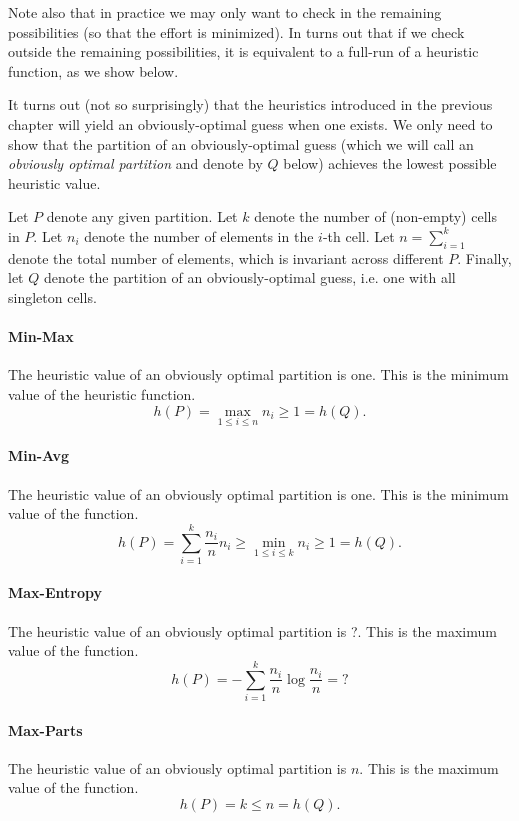 Note also that in practice we may only want to check in the remaining possibilities (so that the effort is minimized). In turns out that if we check outside the remaining possibilities, it is equivalent to a full-run of a heuristic function, as we show below.

It turns out (not so surprisingly) that the heuristics introduced in the previous chapter will yield an obviously-optimal guess when one exists. We only need to show that the partition of an obviously-optimal guess (which we will call an \emph{obviously optimal partition} and denote by $Q$ below) achieves the lowest possible heuristic value.

Let $P$ denote any given partition. Let $k$ denote the number of (non-empty) cells in $P$. Let $n_i$ denote the number of elements in the $i$-th cell. Let $n = \sum_{i=1}^k$ denote the total number of elements, which is invariant across different $P$. Finally, let $Q$ denote the partition of an obviously-optimal guess, i.e. one with all singleton cells.

\paragraph{Min-Max} 
The \minmax{} heuristic value of an obviously optimal partition is one. This is the minimum value of the heuristic function.
\[
h(P) = \max_{1 \le i \le n} n_i \ge 1 = h(Q).
\]

\paragraph{Min-Avg}
The \minavg{} heuristic value of an obviously optimal partition is one. This is the minimum value of the function.
\[
h(P) = \sum_{i=1}^k \frac{n_i}{n} n_i \ge \min_{1 \le i \le k} n_i \ge 1 = h(Q).
\]

\paragraph{Max-Entropy}
The \maxent{} heuristic value of an obviously optimal partition is ?. This is the maximum value of the function.
\[
h(P) = - \sum_{i=1}^k \frac{n_i}{n} \log \frac{n_i}{n} = ?
\]

\paragraph{Max-Parts}
The \maxpar{} heuristic value of an obviously optimal partition is $n$. This is the maximum value of the function.
\[
h(P) = k \le n = h(Q).
\]


